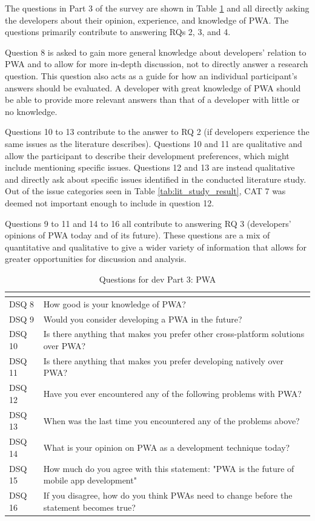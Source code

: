 \documentclass[a4paper,12pt]{article}
\begin{document}
The questions in Part 3 of the survey are shown in Table \ref{tab:devq3} and all directly asking the developers about their opinion, experience, and knowledge of PWA. The questions primarily contribute to answering RQs 2, 3, and 4.

Question 8 is asked to gain more general knowledge about developers’ relation to PWA and to allow for more in-depth discussion, not to directly answer a research question.  This question also acts as a guide for how an individual participant’s answers should be evaluated. A developer with great knowledge of PWA should be able to provide more relevant answers than that of a developer with little or no knowledge.

Questions 10 to 13 contribute to the answer to RQ 2 (if developers experience the same issues as the literature describes). Questions 10 and 11 are qualitative and allow the participant to describe their development preferences, which might include mentioning specific issues. Questions 12 and 13 are instead qualitative and directly ask about specific issues identified in the conducted literature study. Out of the issue categories seen in Table \ref{tab:lit_study_result}, CAT 7 was deemed not important enough to include in question 12.

Questions 9 to 11 and 14 to 16 all contribute to answering RQ 3 (developers’ opinions of PWA today and of its future). These questions are a mix of quantitative and qualitative to give a wider variety of information that allows for greater opportunities for discussion and analysis.

\begin{table}[h]
\centering
{}
\begin{tabular}{|l|p{11cm}|}
\hline
\rowcolor[HTML]{656565}
\multicolumn{1}{|c|}{\cellcolor[HTML]{656565}{\color[HTML]{FFFFFF} Number}} & \multicolumn{1}{l|}{\cellcolor[HTML]{656565}{\color[HTML]{FFFFFF} Question}} \\ \hline
DSQ 8 & How good is your knowledge of PWA? \\
DSQ 9 & Would you consider developing a PWA in the future? \\
DSQ 10 & Is there anything that makes you prefer other cross-platform solutions over PWA? \\
DSQ 11 & Is there anything that makes you prefer developing natively over PWA? \\
DSQ 12 & Have you ever encountered any of the following problems with PWA? \\
DSQ 13 & When was the last time you encountered any of the problems above? \\
DSQ 14 & What is your opinion on PWA as a development technique today? \\
DSQ 15 & How much do you agree with this statement: "PWA is the future of mobile app development" \\
DSQ 16 & If you disagree, how do you think PWAs need to change before the statement becomes true? \\
\hline
\end{tabular}
\caption{Questions for dev Part 3: PWA}
\label{tab:devq3}
\end{table}
\end{document}
